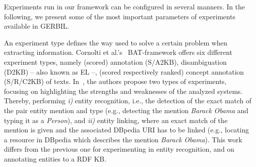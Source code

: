 
Experiments run in our framework can be configured in several manners. In the following, we present some of the most important parameters of experiments available in GERBIL. 

An experiment type defines the way used to solve a certain problem when extracting information.
Cornolti et al.'s~\cite{cornolti} BAT-framework offers six different experiment types, namely (scored) annotation (S/A2KB), disambiguation (D2KB) -- also known as \ac{EL} --, (scored respectively ranked) concept annotation (S/R/C2KB) of texts. 
In~\cite{rizzo2014}, the authors propose two types of experiments, focusing on highlighting the strengths and weaknesses of the analyzed systems.
Thereby, performing \textit{i)} entity recognition, i.e., the detection of the exact match of the pair entity mention and type (e.g., detecting the mention \textit{Barack Obama} and typing it as a \textit{Person}), and \textit{ii)} entity linking, where an exact match of the mention is given and the associated DBpedia URI has to be linked (e.g., locating a resource in DBpedia which describes the mention \textit{Barack Obama}).
This work differs from the previous one for experimenting in entity recognition, and on annotating entities to a \ac{RDF} \ac{KB}.

